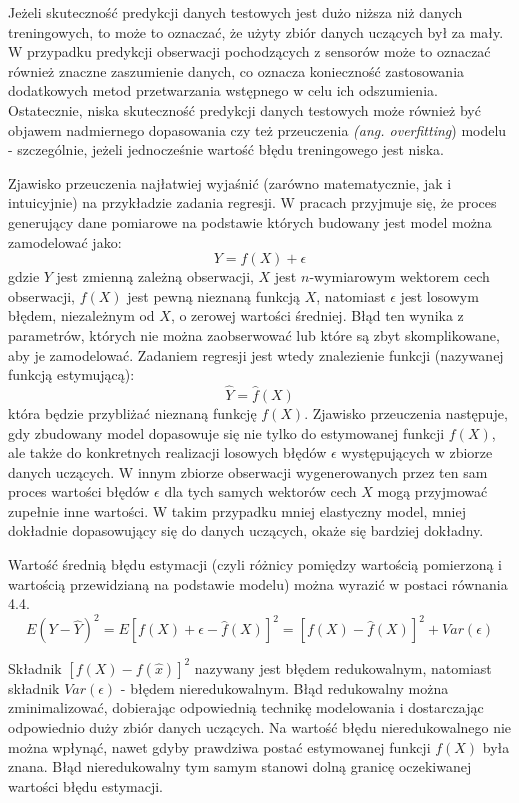 \documentclass[notitlepage]{report}
\begin{document}
Jeżeli skuteczność predykcji danych testowych jest dużo niższa niż danych treningowych, to może to oznaczać, że użyty zbiór danych uczących był za mały. W przypadku predykcji obserwacji pochodzących z sensorów może to oznaczać również znaczne zaszumienie danych, co oznacza konieczność zastosowania dodatkowych metod przetwarzania wstępnego w celu ich odszumienia. Ostatecznie, niska skuteczność predykcji danych testowych może również być objawem nadmiernego dopasowania czy też przeuczenia \textit{(ang. overfitting}) modelu - szczególnie, jeżeli jednocześnie wartość błędu treningowego jest niska. 

Zjawisko przeuczenia najłatwiej wyjaśnić (zarówno matematycznie, jak i intuicyjnie) na przykładzie zadania regresji. W pracach \cite{islr} \cite{eslii} przyjmuje się, że proces generujący dane pomiarowe na podstawie których budowany jest model można zamodelować jako:
\begin{equation}
Y = f(X) + \epsilon
\end{equation}
gdzie $Y$ jest zmienną zależną obserwacji, $X$ jest $n$-wymiarowym wektorem cech obserwacji, $f(X)$ jest pewną nieznaną funkcją $X$, natomiast $\epsilon$ jest losowym błędem, niezależnym od $X$, o zerowej wartości średniej. Błąd ten wynika z parametrów, których nie można zaobserwować lub które są zbyt skomplikowane, aby je zamodelować. Zadaniem regresji jest wtedy znalezienie funkcji (nazywanej funkcją estymującą):
\begin{equation}
\hat{Y} = \hat{f}(X)
\end{equation}
która będzie przybliżać nieznaną funkcję $f(X)$. Zjawisko przeuczenia następuje, gdy zbudowany model dopasowuje się nie tylko do estymowanej funkcji $f(X)$, ale także do konkretnych realizacji losowych błędów $\epsilon$ występujących w zbiorze danych uczących. W innym zbiorze obserwacji wygenerowanych przez ten sam proces wartości błędów $\epsilon$ dla tych samych wektorów cech $X$ mogą przyjmować zupełnie inne wartości. W takim przypadku mniej elastyczny model, mniej dokładnie dopasowujący się do danych uczących, okaże się bardziej dokładny. 

Wartość średnią błędu estymacji (czyli różnicy pomiędzy wartością pomierzoną i wartością przewidzianą na podstawie modelu) można wyrazić w postaci równania 4.4.
\begin{equation}
E(Y-\hat{Y})^2 = E[f(X) + \epsilon - \hat{f}(X)]^2 = [f(X) - \hat{f}(X)]^2 + Var(\epsilon)
\end{equation}

Składnik $[f(X) - f(\hat{x})]^2$ nazywany jest błędem redukowalnym, natomiast składnik $Var(\epsilon)$ - błędem nieredukowalnym. Błąd redukowalny można zminimalizować, dobierając odpowiednią technikę modelowania i dostarczając odpowiednio duży zbiór danych uczących. Na wartość błędu nieredukowalnego nie można wpłynąć, nawet gdyby prawdziwa postać estymowanej funkcji $f(X)$ była znana. Błąd nieredukowalny tym samym stanowi dolną granicę oczekiwanej wartości błędu estymacji. 
\end{document}

